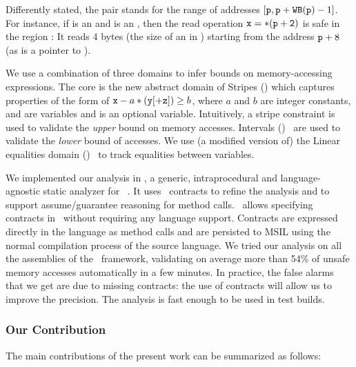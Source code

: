 \documentclass[10pt]{sigplanconf}
\begin{document}
Differently stated, the pair stands for the  range of addresses $[\mathtt{p},
  \mathtt{p} + \mathtt{WB}(\mathtt{p}) - 1]$.
For instance, if  is an  and  is an , then the read operation $\mathtt{x = *(p + 2)}$ is safe in the region :
It reads $4$ bytes (the size of an  in \NET) starting from the address $\mathtt{p} + 8$ (as  is a pointer to ).

We use a combination of three domains to infer bounds on memory-accessing expressions.
The core  is the new abstract domain of Stripes (\Stripes) which captures properties of the form of $\mathtt{x} - a * (\mathtt{y} [+ \mathtt{z}]) \geq b$, where $a$ and $b$ are  integer constants,  and  are variables and  is an optional variable.
Intuitively, a stripe constraint is used to validate the \emph{upper} bound on memory accesses.
Intervals (\Intervals)~\cite{CousotCousot77} are used to validate the
\emph{lower} bound of accesses.
We use (a modified version of) the Linear equalities domain (\Karr)~\cite{Karr76} to track equalities between variables.

We implemented our analysis in \Clousot, a generic, intraprocedural and language-agnostic static analyzer for \NET~\cite{BarMafFerLog07,LogozzoMaf08}.
It uses \Foxtrot\ contracts to refine the analysis and to support assume/guarantee reasoning for method calls.
\Foxtrot\ allows specifying contracts in \NET\ without requiring any
language support. Contracts are expressed directly in the language
as method calls and are persisted to MSIL using the normal
compilation process of the source language.
We tried our analysis on all the assemblies of the \NET\ framework,
validating on average more than  54\% of unsafe memory accesses
automatically in a few minutes.
In practice, the false alarms that we get are due to missing
contracts: the use of contracts will allow us to improve the precision.
The analysis is fast enough to be used in test builds.

\subsubsection*{Our Contribution}
The main contributions of the present work can be summarized as follows:
\end{document}
